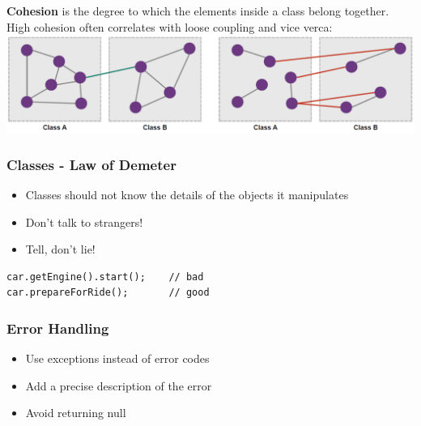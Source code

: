 \textbf{Cohesion} is the degree to which the elements inside a class belong together.\\
High cohesion often correlates with loose coupling and vice verca:
\includegraphics[width=\linewidth]{../img/cohesion.png}

\subsubsection{Classes - Law of Demeter}
\begin{itemize}
    \item Classes should not know the details of the objects it manipulates
    \item Don't talk to strangers!
    \item Tell, don't lie!
\end{itemize}
\begin{lstlisting}
car.getEngine().start();    // bad
car.prepareForRide();       // good
\end{lstlisting}

\subsubsection{Error Handling}
\begin{itemize}
    \item Use exceptions instead of error codes
    \item Add a precise description of the error
    \item Avoid returning null
\end{itemize}

